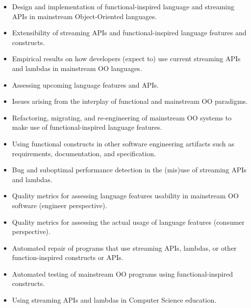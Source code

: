 \documentclass[10pt, conference]{IEEEtran}
\begin{document}
\begin{itemize}

	\item Design and implementation of functional-inspired language and streaming APIs in mainstream Object-Oriented languages.

	\item Extensibility of streaming APIs and functional-inspired language features and constructs.

	\item Empirical results on how developers (expect to) use current streaming APIs and lambdas in mainstream OO languages.

	\item Assessing upcoming language features and APIs.

	\item Issues arising from the interplay of functional and mainstream OO paradigms.

	\item Refactoring, migrating, and re-engineering of mainstream OO systems to make use of functional-inspired language features.

	\item Using functional
		constructs in other software engineering artifacts
		such as requirements, documentation, and specification.

	\item Bug and suboptimal performance detection in the (mis)use of streaming APIs and lambdas.

	\item Quality metrics for assessing 
		language features
		usability in mainstream OO software 
		(engineer perspective).

	\item Quality metrics for assessing the actual usage of 
		language features
		(consumer perspective).

	\item Automated repair of programs that use streaming APIs, lambdas, or other function-inspired constructs or APIs.

	\item Automated testing of mainstream OO programs using functional-inspired constructs.

	\item Using streaming APIs and lambdas in Computer Science education.


\end{itemize}
\end{document}
